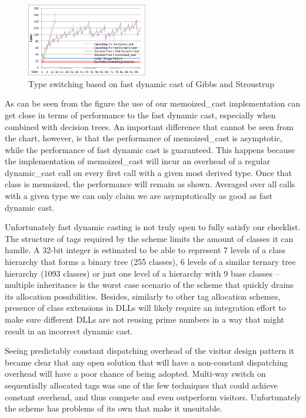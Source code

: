 \documentclass[preprint]{sigplanconf}
\begin{document}
\begin{figure}[htbp]
  \centering
    \includegraphics[width=0.47\textwidth]{DCast-vs-Visitors2.png}
  \caption{Type switching based on fast dynamic cast of Gibbs and Stroustrup\cite{FastDynCast}}
  \label{fig:DCastVis2}
\end{figure}

As can be seen from the figure the use of our memoized\_cast implementation can 
get close in terms of performance to the fast dynamic cast, especially 
when combined with decision trees. An important difference that cannot be seen 
from the chart, however, is that the performance of memoized\_cast is 
asymptotic, while the performance of fast dynamic cast is guaranteed. This 
happens because the implementation of memoized\_cast will incur an overhead of 
a regular dynamic\_cast call on every first call with a given most derived type. 
Once that class is memoized, the performance will remain as shown. Averaged over 
all calls with a given type we can only claim we are asymptotically as good as 
fast dynamic cast.

Unfortunately fast dynamic casting is not truly open to fully satisfy our 
checklist. The structure of tags required by the scheme limits the amount of 
classes it can handle. A 32-bit integer is estimated to be able to represent 7 
levels of a class hierarchy that forms a binary tree (255 classes), 6 levels of 
a similar ternary tree hierarchy (1093 classes) or just one level of a hierarchy 
with 9 base classes -- multiple inheritance is the worst case scenario of the 
scheme that quickly drains its allocation possibilities. Besides, similarly to 
other tag allocation schemes, presence of class extensions in DLLs will likely 
require an integration effort to make sure different DLLs are not reusing prime 
numbers in a way that might result in an incorrect dynamic cast.

Seeing predictably constant dispatching overhead of the visitor design pattern 
it became clear that any open solution that will have a non-constant dispatching 
overhead will have a poor chance of being adopted. Multi-way switch on 
sequentially allocated tags\cite{Spuler94} was one of the few techniques that 
could achieve constant overhead, and thus compete and even outperform visitors. 
Unfortunately the scheme has problems of its own that make it unsuitable.
\end{document}
